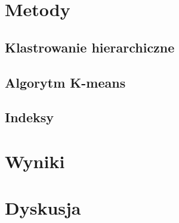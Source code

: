 \documentclass{article}
\begin{document}
\section{Metody}
\subsection{Klastrowanie hierarchiczne}
\subsection{Algorytm K-means}
\subsection{Indeksy}
\section{Wyniki}
\section{Dyskusja}




\end{document}
